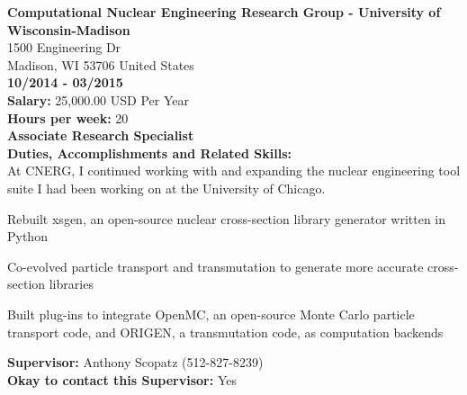 \noindent\textbf{Computational Nuclear Engineering Research Group - University of Wisconsin-Madison}\\
1500 Engineering Dr\\
Madison, WI   53706 United States\\
\textbf{10/2014 - 03/2015}\\
\textbf{Salary:} 25,000.00  USD Per Year\\
\textbf{Hours per week:} 20\\
\textbf{Associate Research Specialist}\\
\textbf{Duties, Accomplishments and Related Skills:}\\
At CNERG, I continued working with and expanding the nuclear engineering tool suite I had been working on at the University of Chicago.
\begin{tightlist}

\item Rebuilt xsgen, an open-source nuclear cross-section library generator written in Python

\item Co-evolved particle transport and transmutation to generate more accurate cross-section libraries

\item Built plug-ins to integrate OpenMC, an open-source Monte Carlo particle transport code, and ORIGEN, a transmutation code, as computation backends

\end{tightlist}
\textbf{Supervisor:} Anthony Scopatz (512-827-8239)\\
\textbf{Okay to contact this Supervisor:} Yes\\

